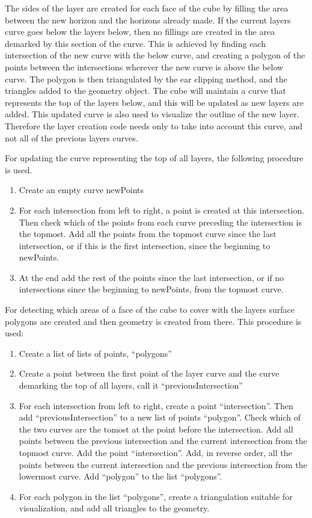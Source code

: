 \documentclass[a4paper,12pt]{report}
\begin{document}
The sides of the layer are created for each face of the cube by filling the area between the new horizon and the horizons already made. If the current layers curve goes below the layers below, then no fillings are created in the area demarked by this section of the curve. This is achieved by finding each intersection of the new curve with the below curve, and creating a polygon of the points between the intersections wherever the new curve is above the below curve. The polygon is then triangulated by the ear clipping method, and the triangles added to the geometry object. The cube will maintain a curve that represents the top of the layers below, and this will be updated as new layers are added. This updated curve is also used to visualize the outline of the new layer. Therefore the layer creation code needs only to take into account this curve, and not all of the previous layers curves.

For updating the curve representing the top of all layers, the following procedure is used. 
\begin{enumerate}
 \item Create an empty curve newPoints
 \item For each intersection from left to right, a point is created at this intersection. Then check which of the points from each curve preceding the intersection is the topmost. Add all the points from the topmost curve since the last intersection, or if this is the first intersection, since the beginning to newPoints.
 \item At the end add the rest of the points since the last intersection, or if no intersections since the beginning to newPoints, from the topmost curve.
\end{enumerate}

For detecting which areas of a face of the cube to cover with the layers surface polygons are created and then geometry is created from there. This procedure is used:
\begin{enumerate}
 \item Create a list of lists of points, ``polygons''
 \item Create a point between the first point of the layer curve and the curve demarking the top of all layers, call it ``previousIntersection''
 \item For each intersection from left to right, create a point ``intersection''. Then add ``previousIntersection'' to a new list of points ``polygon''. Check which of the two curves are the tomost at the point before the intersection. Add all points between the previous intersection and the current intersection from the topmost curve. Add the point ``intersection''. Add, in reverse order, all the points between the current intersection and the previous intersection from the lowermost curve. Add ``polygon'' to the list ``polygons''.
 \item For each polygon in the list ``polygons'', create a triangulation suitable for visualization, and add all triangles to the geometry.
\end{enumerate}
\end{document}

